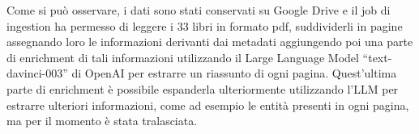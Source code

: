 Come si può osservare, i dati sono stati conservati su Google Drive e il job di ingestion ha permesso di leggere i 33 libri in formato pdf,
suddividerli in pagine assegnando loro le informazioni derivanti dai metadati aggiungendo poi una parte di enrichment di tali informazioni 
utilizzando il Large Language Model ``text-davinci-003'' di OpenAI per estrarre un riassunto di ogni pagina. Quest'ultima parte di enrichment è possibile espanderla ulteriormente
utilizzando l'LLM per estrarre ulteriori informazioni, come ad esempio le entità presenti in ogni pagina, ma per il momento è stata tralasciata.